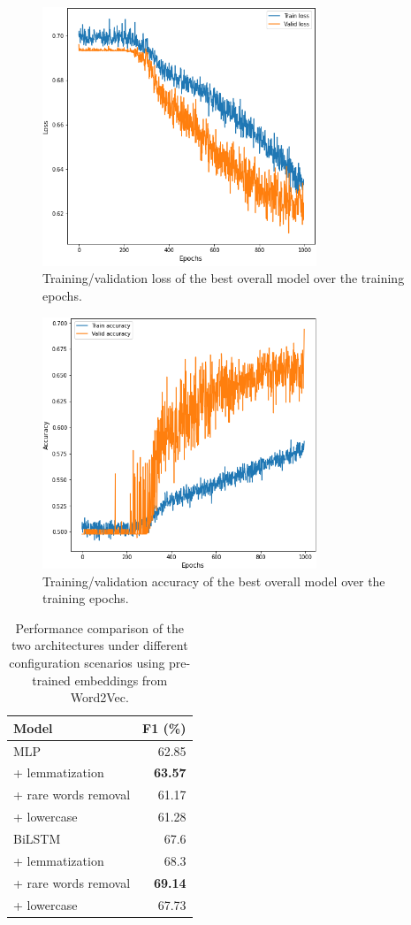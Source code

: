\documentclass[11pt,a4paper]{article}
\begin{document}



\begin{figure}[H]
  \includegraphics[width=8.2cm,keepaspectratio]{images/loss.png}
  \caption{Training/validation loss of the best overall model over the training epochs.}\label{fig:lstm_loss}
\end{figure}

\begin{figure}[H]
  \includegraphics[width=8.2cm,keepaspectratio]{images/accuracy.png}
  \caption{Training/validation accuracy of the best overall model over the training epochs.}\label{fig:lstm_accuracy}
\end{figure}

\begin{table}[H]
  \centering
  \begin{tabular}{lr} \toprule
  \textbf{Model} & \textbf{F1 (\%)} \\ \midrule
  MLP & 62.85 \\
  + lemmatization & \textbf{63.57} \\
  + rare words removal & 61.17 \\
  + lowercase & 61.28 \\ \midrule
  BiLSTM  & 67.6 \\
  + lemmatization & 68.3 \\
  + rare words removal & \textbf{69.14} \\
  + lowercase & 67.73 \\
  \bottomrule
  \end{tabular}
  \caption{\label{word2vec_models} Performance comparison of the two architectures under different configuration scenarios using pre-trained embeddings from Word2Vec. }
\end{table}
\end{document}
